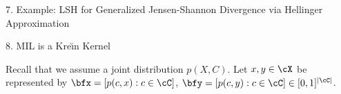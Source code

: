 \documentclass[final]{beamer}
\newcommand{\kr}{Kre\u{\i}n\xspace}
\DeclareMathOperator{\hel}{hel}
\newlength{\threecolwid}
\begin{document}
\begin{frame}[t]
\begin{columns}[t]
\begin{column}{\threecolwid}
\begin{block}{7. Example: LSH for Generalized Jensen-Shannon 
			Divergence via Hellinger Approximation}
%		
		
	\end{block}
	\begin{block}{8. MIL is a \kr Kernel}
 		
 		
 		
 		Recall that we assume a joint distribution $ 
 		p(X,C) $.
 		Let $ x,y\in \cX $ be represented 
 		by 
 		$\bfx=[p(c,x):c\in \cC]$, $ \bfy=[p(c,y):c\in 
 		\cC]\in 
 		[0,1]^{|\cC|}$.
 		

\end{block}
\end{column}
\end{columns}
\end{frame}
\end{document}
